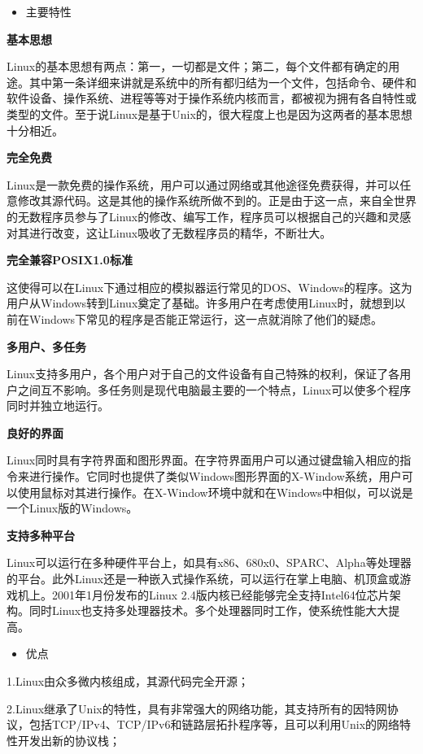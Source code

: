 \documentclass[
]{article}
\begin{document}
\begin{itemize}
\item
  主要特性
\end{itemize}

\textbf{基本思想}

Linux的基本思想有两点：第一，一切都是文件；第二，每个文件都有确定的用途。其中第一条详细来讲就是系统中的所有都归结为一个文件，包括命令、硬件和软件设备、操作系统、进程等等对于操作系统内核而言，都被视为拥有各自特性或类型的文件。至于说Linux是基于Unix的，很大程度上也是因为这两者的基本思想十分相近。

\textbf{完全免费}

Linux是一款免费的操作系统，用户可以通过网络或其他途径免费获得，并可以任意修改其源代码。这是其他的操作系统所做不到的。正是由于这一点，来自全世界的无数程序员参与了Linux的修改、编写工作，程序员可以根据自己的兴趣和灵感对其进行改变，这让Linux吸收了无数程序员的精华，不断壮大。

\textbf{完全兼容POSIX1.0标准}

这使得可以在Linux下通过相应的模拟器运行常见的DOS、Windows的程序。这为用户从Windows转到Linux奠定了基础。许多用户在考虑使用Linux时，就想到以前在Windows下常见的程序是否能正常运行，这一点就消除了他们的疑虑。

\textbf{多用户、多任务}

Linux支持多用户，各个用户对于自己的文件设备有自己特殊的权利，保证了各用户之间互不影响。多任务则是现代电脑最主要的一个特点，Linux可以使多个程序同时并独立地运行。

\textbf{良好的界面}

Linux同时具有字符界面和图形界面。在字符界面用户可以通过键盘输入相应的指令来进行操作。它同时也提供了类似Windows图形界面的X-Window系统，用户可以使用鼠标对其进行操作。在X-Window环境中就和在Windows中相似，可以说是一个Linux版的Windows。

\textbf{支持多种平台}

Linux可以运行在多种硬件平台上，如具有x86、680x0、SPARC、Alpha等处理器的平台。此外Linux还是一种嵌入式操作系统，可以运行在掌上电脑、机顶盒或游戏机上。2001年1月份发布的Linux
2.4版内核已经能够完全支持Intel64位芯片架构。同时Linux也支持多处理器技术。多个处理器同时工作，使系统性能大大提高。

\begin{itemize}
\item
  优点
\end{itemize}

1.Linux由众多微内核组成，其源代码完全开源；

2.Linux继承了Unix的特性，具有非常强大的网络功能，其支持所有的因特网协议，包括TCP/IPv4、TCP/IPv6和链路层拓扑程序等，且可以利用Unix的网络特性开发出新的协议栈；
\end{document}
